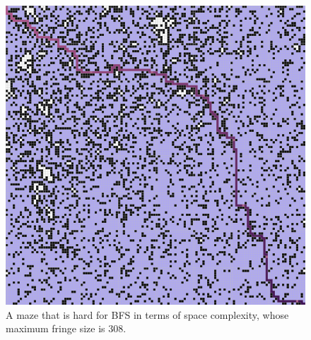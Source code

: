 \documentclass[letter]{article}
\begin{document}
\begin{enumerate}[resume]
\begin{enumerate}
\begin{enumerate}
\begin{figure}
					\includegraphics[width=\textwidth]{../pics/bf/308.png}
					\caption{\label{fig:bf1}A maze that is hard for BFS in terms of space complexity, whose maximum fringe size is 308. }
					

\end{figure}
\end{enumerate}
\end{enumerate}
\end{enumerate}
\end{document}
